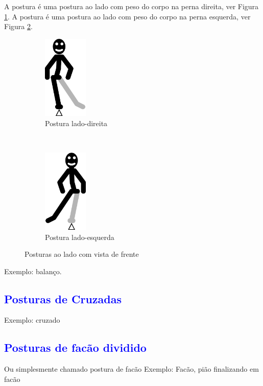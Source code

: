 A postura  é uma postura ao lado com peso do corpo na perna direita, ver Figura \ref{fig:ladodireita}.
A postura  é uma postura ao lado com peso do corpo na perna esquerda, ver Figura \ref{fig:ladoesquerda}.
\begin{figure}[H]
    \centering
    \begin{subfigure}[b]{0.3\textwidth}
        \includegraphics[height=4cm]{chapters/cap-posturas/postura-lateral-der.eps}
        \caption{Postura lado-direita}
        \label{fig:ladodireita}
    \end{subfigure}
    ~ %
    \begin{subfigure}[b]{0.3\textwidth}
        \includegraphics[height=4cm]{chapters/cap-posturas/postura-lateral-esq.eps}
        \caption{Postura lado-esquerda}
        \label{fig:ladoesquerda}
    \end{subfigure}
    \caption{Posturas ao lado  com vista de frente}\label{fig:ladoderesq}
\end{figure}


Exemplo: balanço.

\subsection{\textcolor{blue}{ Posturas de Cruzadas }}
Exemplo: cruzado

\subsection{\textcolor{blue}{ Posturas de facão dividido}}
Ou simplesmente chamado postura de facão
Exemplo: Facão, pião finalizando em facão

